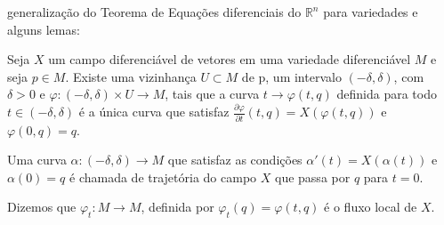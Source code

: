 generalização do Teorema de Equações diferenciais do $\mathbb{R}^{n}$ para variedades e alguns lemas:
\begin{theorem}
    \label{loc:teo_2_:_equações_diferenciais}
    Seja $X$ um campo diferenciável de vetores em uma variedade diferenciável $M$ e seja $p \in M$. Existe uma vizinhança $U\subset M$ de p, um intervalo $(-\delta,\delta)$, com $\delta>0$ e $\varphi:(-\delta, \delta)\times U\to M$, tais que a curva $t \to \varphi(t, q)$ definida para todo $t \in (-\delta, \delta)$ é a única curva que satisfaz $\frac{\partial \varphi}{\partial t}(t, q)=X(\varphi(t, q))$ e $\varphi(0, q)=q$.

    Uma curva $\alpha:(-\delta, \delta)\to M$ que satisfaz as condições $\alpha'(t)=X(\alpha(t))$ e $\alpha(0)=q$ é chamada de trajetória do campo $X$ que passa por $q$ para $t=0$.

    Dizemos que $\varphi_{t}:M\to M$, definida por $\varphi_{t}(q)=\varphi(t, q)$ é o fluxo local de $X$.
    \begin{center}

\end{center}
\end{theorem}
